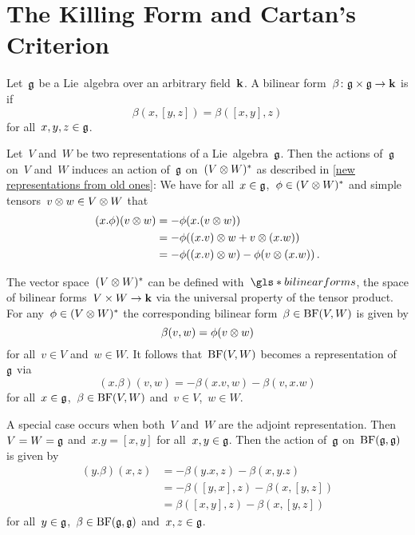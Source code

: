 \section{The Killing Form and Cartan’s Criterion}




\begin{definition}
  \label{associative bilinear form}
  Let~$\mathfrak{g}$ be a Lie~algebra over an arbitrary field~$\mathbf{k}$.
  A bilinear form~$\beta \colon \mathfrak{g} \times \mathfrak{g} \to \mathbf{k}$ is  if
  \[
    \beta(x,[y,z])
    =
    \beta([x,y],z)
  \]
  for all~$x, y, z \in \mathfrak{g}$.
\end{definition}


\begin{remark}
  \label{associative is invariant}
  Let~$V$ and~$W$ be two representations of a Lie~algebra~$\mathfrak{g}$.
  Then the actions of~$\mathfrak{g}$ on~$V$ and~$W$ induces an action of~$\mathfrak{g}$ on~$(V \otimes W)^*$ as described in \cref{new representations from old ones}:
  We have for all~$x \in \mathfrak{g}$,~$\phi \in (V \otimes W)^*$ and simple tensors~$v \otimes w \in V \otimes W$ that
  \begin{align*}
    (x.\phi)(v \otimes w)
    &=
    - \phi(x.(v \otimes w))
    \\
    &=
    - \phi((x.v) \otimes w + v \otimes (x.w))
    \\
    &=
    - \phi((x.v) \otimes w) - \phi(v \otimes (x.w)) \,.
  \end{align*}
  
  The vector space~$(V \otimes W)^*$ can be defined with~$\gls*{bilinear forms}$, the space of bilinear forms~$V \times W \to \mathbf{k}$ via the universal property of the tensor product.
  For any~$\phi \in (V \otimes W)^*$ the corresponding bilinear form~$\beta \in \operatorname{BF}(V,W)$ is given by
  \[
    \beta(v,w)
    =
    \phi(v \otimes w)
  \]
  for all~$v \in V$ and~$w \in W$.
  It follows that~$\operatorname{BF}(V,W)$ becomes a representation of~$\mathfrak{g}$ via
  \[
    (x.\beta)(v,w)
    =
    - \beta(x.v,w) - \beta(v,x.w)
  \]
  for all~$x \in \mathfrak{g}$,~$\beta \in \operatorname{BF}(V,W)$ and~$v \in V$,~$w \in W$.
  
  A special case occurs when both~$V$ and~$W$ are the adjoint representation.
  Then~$V = W = \mathfrak{g}$ and~$x.y = [x,y]$ for all~$x, y \in \mathfrak{g}$.
  Then the action of~$\mathfrak{g}$ on~$\operatorname{BF}(\mathfrak{g},\mathfrak{g})$ is given by
  \begin{align*}
    (y.\beta)(x,z)
    &=
    - \beta(y.x, z) - \beta(x, y.z)
    \\
    &=
    - \beta([y,x], z) - \beta(x, [y,z])
    \\
    &=
    \beta([x,y], z) - \beta(x, [y,z])
  \end{align*}
  for all~$y \in \mathfrak{g}$,~$\beta \in \operatorname{BF}(\mathfrak{g}, \mathfrak{g})$ and~$x, z \in \mathfrak{g}$.
  

\end{remark}
